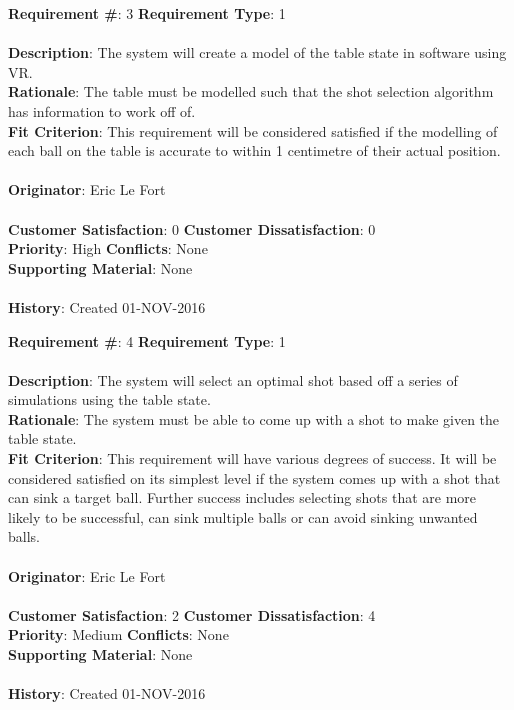 \documentclass[titlepage]{article}
\begin{document}
\begin{framed}
	\noindent\textbf{Requirement \#}: 3 \hfill \textbf{Requirement Type}: 1 \hfill\\\\
	\noindent\textbf{Description}: The system will create a model of the table state in software using VR.\\
	\textbf{Rationale}: The table must be modelled such that the shot selection algorithm has information to work off of.\\
	\textbf{Fit Criterion}: This requirement will be considered satisfied if the modelling of each ball on the table is accurate to within 1 centimetre of their actual position.\\\\
	\textbf{Originator}: Eric Le Fort\\\\
	\noindent\textbf{Customer Satisfaction}: 0 \hfill 	\textbf{Customer Dissatisfaction}: 0 \hfill\\
	\textbf{Priority}: High \hfill \textbf{Conflicts}: None \hfill\\
	\textbf{Supporting Material}: None\\\\
	\noindent\textbf{History}: Created 01-NOV-2016
\end{framed}

\begin{framed}
	\noindent\textbf{Requirement \#}: 4 \hfill \textbf{Requirement Type}: 1 \hfill\\\\
	\noindent\textbf{Description}: The system will select an optimal shot based off a series of simulations using the table state.\\
	\textbf{Rationale}: The system must be able to come up with a shot to make given the table state.\\
	\textbf{Fit Criterion}: This requirement will have various degrees of success. It will be considered satisfied on its simplest level if the system comes up with a shot that can sink a target ball. Further success includes selecting shots that are more likely to be successful, can sink multiple balls or can avoid sinking unwanted balls.\\\\
	\textbf{Originator}: Eric Le Fort\\\\
	\noindent\textbf{Customer Satisfaction}: 2 \hfill 	\textbf{Customer Dissatisfaction}: 4 \hfill\\
	\textbf{Priority}: Medium \hfill \textbf{Conflicts}: None \hfill\\
	\textbf{Supporting Material}: None\\\\
	\noindent\textbf{History}: Created 01-NOV-2016
\end{framed}
\end{document}
